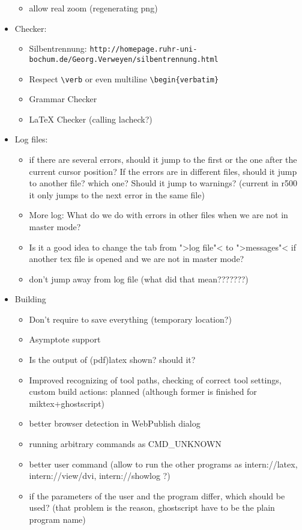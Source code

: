 \documentclass[10pt,a4paper,landscape]{report}
\begin{document}
\begin{itemize}
\begin{itemize}
		\item allow real zoom (regenerating png)
	\end{itemize}
	\item  Checker: \begin{itemize}
		\item Silbentrennung: \verb+http://homepage.ruhr-uni-bochum.de/Georg.Verweyen/silbentrennung.html+
		\item Respect \verb+\verb+ or even multiline \verb+\begin{verbatim}+
		\item Grammar Checker
		\item LaTeX Checker	(calling lacheck?)
	\end{itemize}
	\item Log files:\begin{itemize}
	\item if there are several errors, should it jump to the first or the one after the current cursor position? If the errors are in different files, should it jump to another file? which one? Should it jump to warnings? 	(current in r500 it only jumps to the next error in the same file) 
		\item More log: What do we do with errors in other files when we are not in master mode? 
		\item Is it a good idea to change the tab from ">log file"< to ">messages"< if another tex file is opened and we are not in master mode?
		\item don't jump away from log file (what did that mean???????)
	\end{itemize}
	\item Building \begin{itemize}
		\item Don't require to save everything (temporary location?)
		\item Asymptote support
		\item Is the output of (pdf)latex shown? should it?
		\item Improved recognizing of tool paths, checking of correct tool settings,  custom build actions: planned (although former is finished for miktex+ghostscript)
		\item better browser detection in WebPublish dialog 
		\item running arbitrary commands as CMD\_UNKNOWN
		\item better user command (allow to run the other programs as intern://latex, intern://view/dvi, intern://showlog ?)
		\item if the parameters of the user and the program differ, which should be used? (that problem is the reason, ghostscript have to be the plain program name)

\end{itemize}
\end{itemize}
\end{document}
